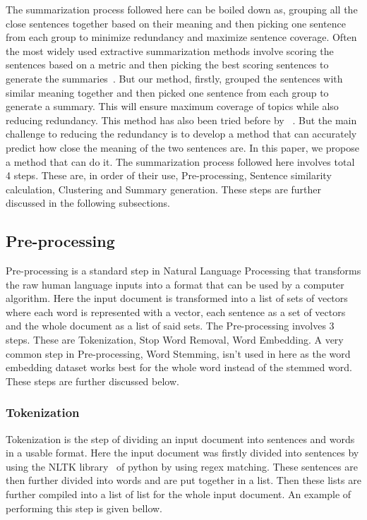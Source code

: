 The summarization process followed here can be boiled down as, grouping all the close sentences
together based on their meaning and then picking one sentence from each group to minimize redundancy
and maximize sentence coverage.
Often the most widely used extractive summarization methods involve scoring the sentences based on a metric and
then picking the best scoring sentences to generate the summaries~\cite{das-2022-tfidf,sarkar-2012-tfidf}.
But our method, firstly, grouped the sentences with similar meaning together and then picked one
sentence from each group to generate a summary.
This will ensure maximum coverage of topics while also reducing redundancy.
This method has also been tried before by \citeauthor{roychowdhury-etal-2022-spectral-base}~\cite{roychowdhury-etal-2022-spectral-base}.
But the main challenge to reducing the redundancy is to develop a method that can accurately predict how close the
meaning of the two sentences are.
In this paper, we propose a method that can do it.
The summarization process followed here involves total 4 steps.
These are, in order of their use, Pre-processing, Sentence similarity calculation, Clustering and Summary generation.
These steps are further discussed in the following subsections.

\subsection{Pre-processing}\label{subsec:pre-processing}
Pre-processing is a standard step in Natural Language Processing that transforms the raw human language
inputs into a format that can be used by a computer algorithm.
Here the input document is transformed into a list of sets of vectors where each word is represented
with a vector, each sentence as a set of vectors and the whole document as a list of said sets.
The Pre-processing involves 3 steps.
These are Tokenization, Stop Word Removal, Word Embedding.
A very common step in Pre-processing, Word Stemming, isn't used in here as the word embedding dataset
works best for the whole word instead of the stemmed word.
These steps are further discussed below.

\subsubsection{Tokenization}
Tokenization is the step of dividing an input document into sentences and words in a usable format.
Here the input document was firstly divided into sentences by using the NLTK library~\cite{Bird-2009-nltk} of
python by using regex matching.
These sentences are then further divided into words and are put together in a list.
Then these lists are further compiled into a list of list for the whole input document.
An example of performing this step is given bellow.\\

